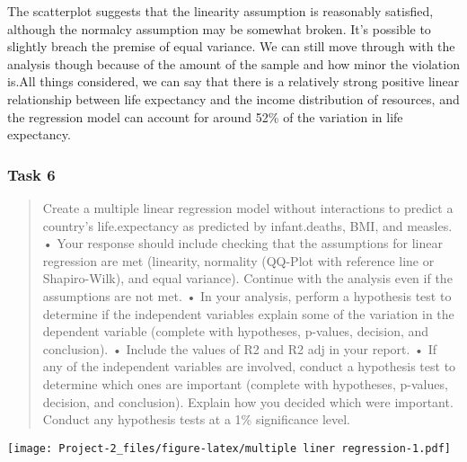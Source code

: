 \documentclass[
]{article}
\newenvironment{Shaded}{\begin{snugshade}}{\end{snugshade}}
\newcommand{\AttributeTok}[1]{\textcolor[rgb]{0.77,0.63,0.00}{#1}}
\newcommand{\FunctionTok}[1]{\textcolor[rgb]{0.00,0.00,0.00}{#1}}
\newcommand{\NormalTok}[1]{#1}
\newcommand{\SpecialCharTok}[1]{\textcolor[rgb]{0.00,0.00,0.00}{#1}}
\newcommand{\StringTok}[1]{\textcolor[rgb]{0.31,0.60,0.02}{#1}}
\begin{document}
The scatterplot suggests that the linearity assumption is reasonably
satisfied, although the normalcy assumption may be somewhat broken. It's
possible to slightly breach the premise of equal variance. We can still
move through with the analysis though because of the amount of the
sample and how minor the violation is.All things considered, we can say
that there is a relatively strong positive linear relationship between
life expectancy and the income distribution of resources, and the
regression model can account for around 52\% of the variation in life
expectancy.

\hypertarget{task-6}{%
\subsubsection{Task 6}\label{task-6}}

\begin{quote}
Create a multiple linear regression model without interactions to
predict a country's life.expectancy as predicted by infant.deaths, BMI,
and measles. • Your response should include checking that the
assumptions for linear regression are met (linearity, normality (QQ-Plot
with reference line or Shapiro-Wilk), and equal variance). Continue with
the analysis even if the assumptions are not met. • In your analysis,
perform a hypothesis test to determine if the independent variables
explain some of the variation in the dependent variable (complete with
hypotheses, p-values, decision, and conclusion). • Include the values of
R2 and R2 adj in your report. • If any of the independent variables are
involved, conduct a hypothesis test to determine which ones are
important (complete with hypotheses, p-values, decision, and
conclusion). Explain how you decided which were important. Conduct any
hypothesis tests at a 1\% significance level.
\end{quote}

\begin{Shaded}
\end{Shaded}

\texttt{[image: Project-2\_files/figure-latex/multiple liner regression-1.pdf]}
\end{document}

